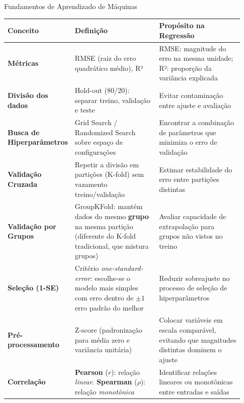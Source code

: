 \begin{slide}{Fundamentos de Aprendizado de Máquinas}
  \footnotesize
  \vspace{-0.15cm}
  \centering
  \scriptsize
  \begin{tabular}{p{0.17\linewidth} p{0.38\linewidth} p{0.38\linewidth}}
      \toprule
      \textbf{Conceito} & \textbf{Definição} & \textbf{Propósito na Regressão} \\
      \midrule
      \textbf{Métricas}
      & RMSE (raiz do erro quadrático médio), R²
      & RMSE: magnitude do erro na mesma unidade; R²: proporção da variância explicada
      \\
      \midrule
      \textbf{Divisão dos dados}
      & Hold-out (80/20): separar treino, validação e teste
      & Evitar contaminação entre ajuste e avaliação \\
      \midrule
      \textbf{Busca de Hiperparâmetros}
      & Grid Search / Randomized Search sobre espaço de configurações
      & Encontrar a combinação de parâmetros que minimiza o erro de validação \\
      \midrule
      \textbf{Validação Cruzada}
      & Repetir a divisão em partições (K-fold) sem vazamento treino/validação
      & Estimar estabilidade do erro entre partições distintas \\
      \midrule
      \textbf{Validação por Grupos}
      & GroupKFold: mantém dados do mesmo \textbf{grupo} na mesma partição (diferente do K-fold tradicional, que mistura grupos)
      & Avaliar capacidade de extrapolação para grupos não vistos no treino \\
      \midrule
      \textbf{Seleção (1-SE)}
      & Critério \textit{one-standard-error}: escolhe-se o modelo mais simples com erro dentro de $\pm 1$ erro padrão do melhor \cite{Hastie2009ESL}
      & Reduzir sobreajuste no processo de seleção de hiperparâmetros \\
      \midrule
      \textbf{Pré-processamento}
      & Z-score (padronização para média zero e variância unitária)
      & Colocar variáveis em escala comparável, evitando que magnitudes distintas dominem o ajuste \\
      \midrule
      \textbf{Correlação}
      & \textbf{Pearson} ($r$): relação \textit{linear}. \textbf{Spearman} ($\rho$): relação \textit{monotônica}
      & Identificar relações lineares ou monotônicas entre entradas e saídas \\
      \bottomrule
    \end{tabular}
\end{slide}

